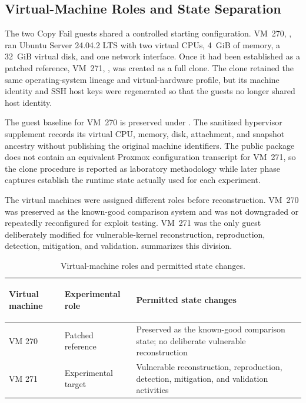 \subsection{Virtual-Machine Roles and State Separation}

The two Copy Fail guests shared a controlled starting configuration. VM~270,
, ran Ubuntu Server 24.04.2 LTS with two virtual CPUs, 4~GiB of
memory, a 32~GiB virtual disk, and one  network interface. Once it
had been established as a patched reference, VM~271, , was
created as a full clone. The clone retained the same operating-system lineage
and virtual-hardware profile, but its machine identity and SSH host keys were
regenerated so that the guests no longer shared host identity.

The guest baseline for VM~270 is preserved under
. The sanitized hypervisor supplement
 records its virtual CPU,
memory, disk,  attachment, and snapshot ancestry without publishing
the original machine identifiers. The public package does not contain an
equivalent Proxmox configuration transcript for VM~271, so the clone procedure
is reported as laboratory methodology while later phase captures establish the
runtime state actually used for each experiment.

The virtual machines were assigned different roles before reconstruction.
VM~270 was preserved as the known-good comparison system and was not downgraded
or repeatedly reconfigured for exploit testing. VM~271 was the only guest
deliberately modified for vulnerable-kernel reconstruction, reproduction,
detection, mitigation, and validation.  summarizes this
division.

\begin{table}[H]
    \centering
    \caption{Virtual-machine roles and permitted state changes.}
    \label{tab:vm-roles}
    \small
    \begin{tabularx}{\textwidth}{@{}>{\bfseries\raggedright\arraybackslash}p{}p{}Y@{}}
        \toprule
        Virtual machine & Experimental role & Permitted state changes \\
        \midrule
        VM 270  &
        Patched reference &
        Preserved as the known-good comparison state; no deliberate
        vulnerable reconstruction \\

        VM 271  &
        Experimental target &
        Vulnerable reconstruction, reproduction, detection, mitigation, and
        validation activities \\
        \bottomrule
    \end{tabularx}
\end{table}

